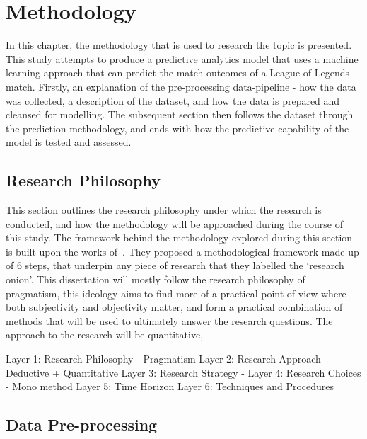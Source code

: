 \chapter{Methodology}\label{ch:methodology}

In this chapter, the methodology that is used to research the topic is presented.
This study attempts to produce a predictive analytics model that uses a machine learning approach that can predict the match outcomes of a League of Legends match.
Firstly, an explanation of the pre-processing data-pipeline - how the data was collected, a description of the dataset, and how the data is prepared and cleansed for modelling.
The subsequent section then follows the dataset through the prediction methodology, and ends with how the predictive capability of the model is tested and assessed.

\section{Research Philosophy}\label{sec:Research Philosophy}

This section outlines the research philosophy under which the research is conducted, and how the methodology will be approached during the course of this study.
The framework behind the methodology explored during this section is built upon the works of~\citet{saunders2007research}.
They proposed a methodological framework made up of 6 steps, that underpin any piece of research that they labelled the `research onion'.
This dissertation will mostly follow the research philosophy of pragmatism, this ideology aims to find more of a practical point of view where both subjectivity and objectivity matter, and form a practical combination of methods that will be used to ultimately answer the research questions.
The approach to the research will be quantitative,

Layer 1: Research Philosophy - Pragmatism
Layer 2: Research Approach - Deductive + Quantitative
Layer 3: Research Strategy -
Layer 4: Research Choices - Mono method
Layer 5: Time Horizon
Layer 6: Techniques and Procedures

\section{Data Pre-processing}\label{sec:Data Pre-processing}
